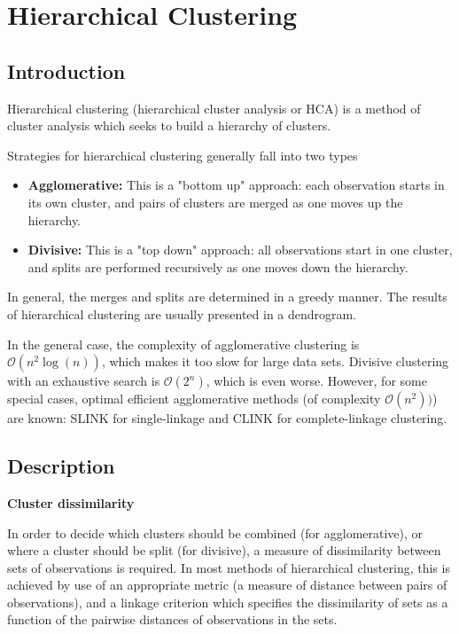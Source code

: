 \newpage
\section{Hierarchical Clustering}



\subsection{Introduction}
Hierarchical clustering (hierarchical cluster analysis or HCA) is a method of cluster analysis which seeks to build a hierarchy of clusters. 

Strategies for hierarchical clustering generally fall into two types
\begin{itemize}
\item \textbf{Agglomerative:} This is a "bottom up" approach: each observation starts in its own cluster, and pairs of clusters are merged as one moves up the hierarchy.

\item \textbf{Divisive:} This is a "top down" approach: all observations start in one cluster, and splits are performed recursively as one moves down the hierarchy.
\end{itemize}
In general, the merges and splits are determined in a greedy manner. The results of hierarchical clustering are usually presented in a dendrogram.

In the general case, the complexity of agglomerative clustering is $\mathcal{O}(n^{2}\log(n))$, which makes it too slow for large data sets. Divisive clustering with an exhaustive search is $\mathcal{O}(2^{n})$, which is even worse. However, for some special cases, optimal efficient agglomerative methods (of complexity $\mathcal{O}(n^{2}))$) are known: SLINK for single-linkage and CLINK for complete-linkage clustering.


\subsection{Description}

\textbf{Cluster dissimilarity}

In order to decide which clusters should be combined (for agglomerative), or where a cluster should be split (for divisive), a measure of dissimilarity between sets of observations is required. In most methods of hierarchical clustering, this is achieved by use of an appropriate metric (a measure of distance between pairs of observations), and a linkage criterion which specifies the dissimilarity of sets as a function of the pairwise distances of observations in the sets.


